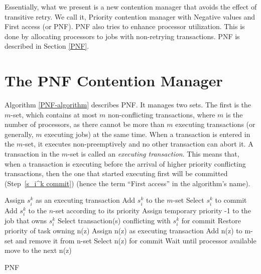 Essentially, what we present is a new contention manager that avoids the effect of transitive retry. We call it, Priority contention manager with Negative values and First access (or PNF). PNF also tries to enhance processor utilization. This is done by allocating processors to jobs with non-retrying transactions. PNF is described in Section \ref{PNF}.
%
\section{The PNF Contention Manager\label{PNF}}
%
Algorithm \ref{PNF-algorithm} describes PNF. It
manages two sets. The first is the $m$-set, which contains at most $m$ non-conflicting
transactions, where $m$ is the number of processors, as
there cannot be more than $m$ executing transactions (or generally,
$m$ executing jobs) at the same time. When a transaction is entered
in the $m$-set, it executes non-preemptively and no other transaction
can abort it. A transaction in the $m$-set is called an \emph{executing
transaction}. 
This means that, when a transaction is executing before
the arrival of higher priority conflicting transactions, then the
one that started executing first will be committed (Step~\ref{s_i^k commit}) (hence the term ``First access'' in the algorithm's name). 
%
\begin{algorithm}[h]
\footnotesize{
\LinesNumbered
{}
{
Assign $s_i^k$ as an executing transaction\;
Add $s_i^k$ to the $m$-set\;
Select $s_i^k$ to commit
}
{
Add $s_i^k$ to the $n$-set according to its priority\label{move to n}\;
Assign temporary priority -1 to the job that owns $s_i^k$ \label{priority to -1}\;
Select transaction(s) conflicting with $s_i^k$ for commit\label{s_i^k commit}\;
}
{
	{
		{
			{
				Restore priority of task owning n(z)\;
				Assign n(z) as executing transaction\;
				Add n(z) to m-set and remove it from n-set\;
				Select n(z) for commit\;
			}
			{
				Wait until processor available
			}
		}
		move to the next n(z)\;
	}
}
}
\caption{PNF} \label{PNF-algorithm}
\end{algorithm}
